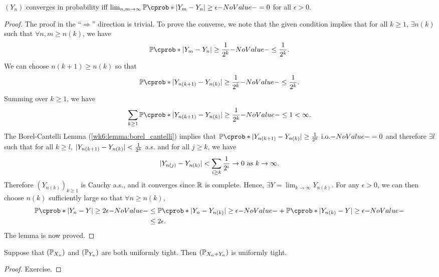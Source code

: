 \documentclass[12pt]{article}
\begin{document}
\begin{Lemma}\label{wk11:lem:Yconvpiff}
$(Y_n)$ converges in probability iff $\lim_{n,m\to\infty} \P(|Y_m-Y_n|\geq \epsilon) =0$ for all $\epsilon>0$.
\end{Lemma}
\begin{proof}
The proof in the ``$\Rightarrow$'' direction is trivial. To prove the converse, we note that the given condition implies that for all $k\geq1$, $\exists n(k)$ such that $\forall n,m \geq n(k)$, we have
\begin{align*}
\P(|Y_m-Y_n|\geq\ofrac{2^k}) \leq \ofrac{2^k}. 
\end{align*}
We can choose $n(k+1) \geq n(k)$ so that
\begin{align*}
\P(|Y_{n(k+1)}-Y_{n(k)}|\geq\ofrac{2^k}) \leq \ofrac{2^k}. 
\end{align*}
Summing over $k\geq 1$, we have
\begin{align*}
\sum_{k\geq1} \P(|Y_{n(k+1)}-Y_{n(k)}|\geq\ofrac{2^k}) \leq 1 <\infty. 
\end{align*}
The Borel-Cantelli Lemma (\cref{wk6:lemma:borel_cantelli}) implies that $\P(|Y_{n(k+1)}-Y_{n(k)}|\geq\ofrac{2^k} \io)=0$ and therefore $\exists l$ such that for all $k\geq l$, $|Y_{n(k+1)}-Y_{n(k)}|<{\frac{1}{2^k}}$ a.s. and for all $j\geq k$, we have
\begin{align*}
|Y_{n(j)}-Y_{n(k)}|< \sum_{i\geq k} {\frac{1}{2^i}} \to 0 \text{ as $k\to\infty$}.
\end{align*}
Therefore $(Y_{n(k)})_{k\geq1}$ is Cauchy a.s., and it converges since $\mathbb{R}$ is complete. Hence, $\exists Y = \lim_{k\to\infty} Y_{n(k)}$. For any $\epsilon>0$, we can then choose $n(k)$ sufficiently large so that $\forall n\geq n(k)$,
\begin{align*}
\P(|Y_n-Y|\geq 2\epsilon)
&\leq \P(|Y_n - Y_{n(k)}|\geq\epsilon) + \P(|Y_{n(k)}-Y|\geq\epsilon) \\
&\leq 2\epsilon.
\end{align*}
The lemma is now proved.
\end{proof}

\begin{Lemma}\label{wk11:lem:XYut}
Suppose that $(\P_{X_n})$ and $(\P_{Y_n})$ are both uniformly tight. Then $(\P_{X_n+Y_n})$ is uniformly tight.
\end{Lemma}
\begin{proof}
Exercise.
\end{proof}
\end{document}
